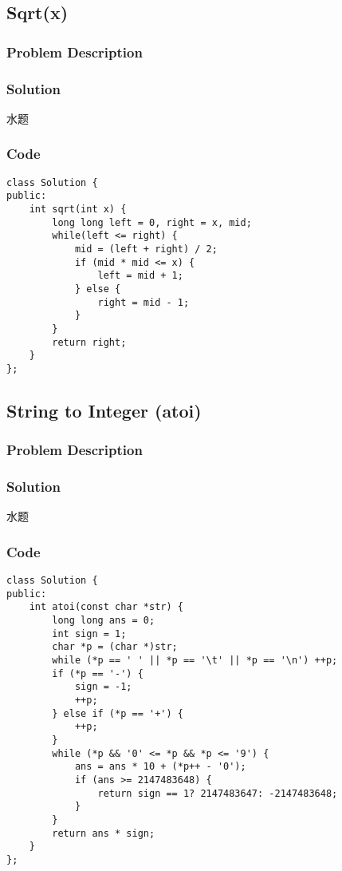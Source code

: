 \documentclass[courier]{article}
\begin{document}
\begin{CJK*}{UTF8}{gkai}
\subsection{ Sqrt(x) }

\subsubsection*{Problem Description}


\subsubsection*{Solution}
水题

\subsubsection*{Code}
\begin{lstlisting}
class Solution {
public:
    int sqrt(int x) {
        long long left = 0, right = x, mid;
        while(left <= right) {
            mid = (left + right) / 2;
            if (mid * mid <= x) {
                left = mid + 1;
            } else {
                right = mid - 1;
            }
        }
        return right;
    }
}; 
\end{lstlisting}


\subsection{ String to Integer (atoi) }

\subsubsection*{Problem Description}


\subsubsection*{Solution}
水题

\subsubsection*{Code}
\begin{lstlisting}
class Solution {
public:
    int atoi(const char *str) {
        long long ans = 0;
        int sign = 1;
        char *p = (char *)str;
        while (*p == ' ' || *p == '\t' || *p == '\n') ++p;
        if (*p == '-') {
            sign = -1;
            ++p;
        } else if (*p == '+') {
            ++p;
        }
        while (*p && '0' <= *p && *p <= '9') {
            ans = ans * 10 + (*p++ - '0');
            if (ans >= 2147483648) {
                return sign == 1? 2147483647: -2147483648;
            }
        }
        return ans * sign;
    }
}; 
\end{lstlisting}



\end{CJK*}
\end{document}
